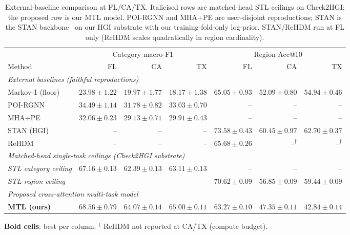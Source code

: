 \begin{table}[!htbp]
\centering
\caption{External-baseline comparison at FL/CA/TX. Italicised rows are matched-head STL ceilings on Check2HGI; the proposed row is our MTL model. POI-RGNN and MHA+PE are user-disjoint reproductions; STAN is the STAN backbone~\cite{luo2021stan} on our HGI substrate with our training-fold-only log-prior. STAN/ReHDM run at FL only (ReHDM scales quadratically in region cardinality).}
\label{tab:external}
\scriptsize
\setlength{\tabcolsep}{2.5pt}
\renewcommand{\arraystretch}{1.1}
\begin{tabular}{l r r r r r r}
\toprule
& \multicolumn{3}{c}{Category macro-F1} & \multicolumn{3}{c}{Region Acc@10} \\
\cmidrule(lr){2-4} \cmidrule(lr){5-7}
Method & FL & CA & TX & FL & CA & TX \\
\midrule
\multicolumn{7}{l}{\emph{External baselines (faithful reproductions)}} \\
\midrule
Markov-1 (floor)             & $23.98\!\!\pm\!\!1.22$ & $19.97\!\!\pm\!\!1.77$ & $18.17\!\!\pm\!\!1.38$ & $65.05\!\!\pm\!\!0.93$ & $52.09\!\!\pm\!\!0.80$ & $54.94\!\!\pm\!\!0.46$ \\
POI-RGNN \cite{capanema2023poirgnn} & $34.49\!\!\pm\!\!1.14$ & $31.78\!\!\pm\!\!0.82$ & $33.03\!\!\pm\!\!0.70$ & --                 & --                 & --                 \\
MHA+PE \cite{zeng2019mhape}  & $32.06\!\!\pm\!\!0.23$ & $29.13\!\!\pm\!\!0.71$ & $29.91\!\!\pm\!\!0.43$ & --                 & --                 & --                 \\
STAN \cite{luo2021stan} (HGI) & --                & --                & --                & $\mathbf{73.58\!\!\pm\!\!0.43}$ & $\mathbf{60.45\!\!\pm\!\!0.97}$ & $\mathbf{62.70\!\!\pm\!\!0.37}$ \\
ReHDM \cite{li2025rehdm}     & --                & --                & --                & $65.68\!\!\pm\!\!0.26$ & --$^{\dagger}$     & --$^{\dagger}$     \\
\midrule
\multicolumn{7}{l}{\emph{Matched-head single-task ceilings (Check2HGI substrate)}} \\
\midrule
\emph{STL category ceiling}  & $67.16\!\!\pm\!\!0.13$ & $62.39\!\!\pm\!\!0.13$ & $63.11\!\!\pm\!\!0.13$ & --                 & --                 & --                 \\
\emph{STL region ceiling}    & --                 & --                 & --                 & $70.62\!\!\pm\!\!0.09$ & $56.85\!\!\pm\!\!0.09$ & $59.44\!\!\pm\!\!0.09$ \\
\midrule
\multicolumn{7}{l}{\emph{Proposed cross-attention multi-task model}} \\
\midrule
\textbf{MTL (ours)} & $\mathbf{68.56\!\!\pm\!\!0.79}$ & $\mathbf{64.07\!\!\pm\!\!0.14}$ & $\mathbf{65.00\!\!\pm\!\!0.11}$ & $63.27\!\!\pm\!\!0.10$ & $47.35\!\!\pm\!\!0.11$ & $42.84\!\!\pm\!\!0.14$ \\
\bottomrule
\end{tabular}

\medskip
\scriptsize \textbf{Bold cells}: best per column. $^{\dagger}$ ReHDM not reported at CA/TX (compute budget).
\end{table}
